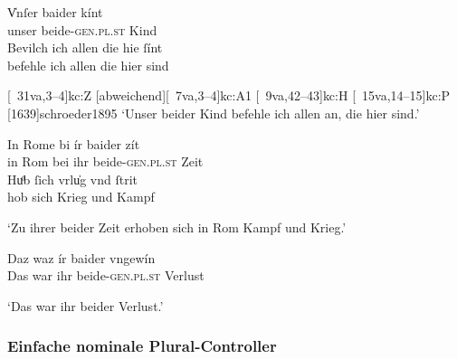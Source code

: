 \begin{exe}
\ex \label{ex:k_beider}
	\begin{xlist}
	\ex \label{ex:k_beider_1}
		\gll V̍nſer baider kínt \\
			unser beide-\textsc{gen.pl.st} Kind \\
	\sn \gll Bevilch ich allen die hie ſínt \\
			befehle ich allen die hier sind \\
		\begin{taggedline}{\parencites%
			[\pno~9rb,25--26]{kc:K}[vgl.]%
			[\pno~8vb,27--28]{kc:C1}%
			[\pno~31va,3--4]{kc:Z}%
			[abweichend][\pno~7va,3--4]{kc:A1}%
			[\pno~9va,42--43]{kc:H}%
			[\pno~15va,14--15]{kc:P}%
			[1639]{schroeder1895}
		}
		\trans `Unser beider Kind befehle ich allen an, die hier sind.'
		\end{taggedline}

	\ex \label{ex:k_beider_2}
		\gll In Rome bi ír baider zít \\
			in Rom bei ihr beide-\textsc{gen.pl.st} Zeit \\
	\sn \gll Huͦb ſich vrlu̍g vnd ſtrit \\
			hob sich Krieg und Kampf \\
		\begin{taggedline}{\parencites
			[\pno~28vb,36--37]{kc:K}[vgl.]%
			[\pno~93va,26--\pno~94ra,1]{kc:Z}[abweichend]%
			[\pno~14va,49--50]{kc:B1}%
			[\pno~24ra,30--31]{kc:VB}%
			[\pno~42ra,17--18]{kc:P}%
			[\pno~20vb,9--10]{kc:A1}%
			[\pno~36rb,6--7]{kc:M}%
			[\pno~28rb,39--40]{kc:H}%
			[4837--4838]{schroeder1895}%
		}
		\trans `Zu ihrer beider Zeit erhoben sich in Rom Kampf und Krieg.'
		\end{taggedline}

	\ex \label{ex:k_beider_3}
		\gll Daz waz ír baider vngewín \\
			Das war ihr beide-\textsc{gen.pl.st} Verlust \\
		\begin{taggedline}{\parencites%
			[\pno~103vb,27]{kc:K}[vgl.]
			[\pno~91va,10]{kc:C1}%
			[\pno~60va,34]{kc:VC}%
			[\pno~352ra,6]{kc:Z}%
			[208]{schroeder1895}%
		}
		\trans `Das war ihr beider Verlust.'
		\end{taggedline}
	\end{xlist}
\end{exe}

\subsubsection{Einfache nominale Plural-Controller}
\label{subsubsec:nomctrlpers}

